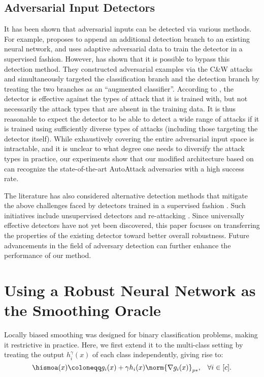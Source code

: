 \documentclass[11pt, letterpaper]{article}
\theoremstyle{plain}
\theoremstyle{definition}
\begin{document}
\subsection{Adversarial Input Detectors}

It has been shown that adversarial inputs can be detected via various methods. For example, \citep{Metzen17} proposes to append an additional detection branch to an existing neural network, and uses adaptive adversarial data to train the detector in a supervised fashion. However, \citep{Carlini17b} has shown that it is possible to bypass this detection method. They constructed adversarial examples via the C\&W attacks \citep{Carlini17a} and simultaneously targeted the classification branch and the detection branch by treating the two branches as an ``augmented classifier''. According to \citep{Carlini17b}, the detector is effective against the types of attack that it is trained with, but not necessarily the attack types that are absent in the training data. It is thus reasonable to expect the detector to be able to detect a wide range of attacks if it is trained using sufficiently diverse types of attacks (including those targeting the detector itself). While exhaustively covering the entire adversarial input space is intractable, and it is unclear to what degree one needs to diversify the attack types in practice, our experiments show that our modified architecture based on \citep{Metzen17} can recognize the state-of-the-art AutoAttack adversaries with a high success rate.

The literature has also considered alternative detection methods that mitigate the above challenges faced by detectors trained in a supervised fashion \citep{Carrara19}. Such initiatives include unsupervised detectors \citep{Aldahdooh21a, Aldahdooh21b} and re-attacking \citep{Ahmadi21}. Since universally effective detectors have not yet been discovered, this paper focuses on transferring the properties of the existing detector toward better overall robustness. Future advancements in the field of adversary detection can further enhance the performance of our method.



\section{Using a Robust Neural Network as the Smoothing Oracle} \label{sec:STD+ROB}

Locally biased smoothing was designed for binary classification problems, making it restrictive in practice. Here, we first extend it to the multi-class setting by treating the output $h^\gamma_i (x)$ of each class independently, giving rise to:
\begin{equation} \label{eq:adap_sm_1}
    \hismoa (x) \coloneqq g_i (x) + \gamma h_i (x) \norm{\nabla g_i (x)}_{p*}, \;\;\; \forall i \in [c].
\end{equation}
\end{document}

